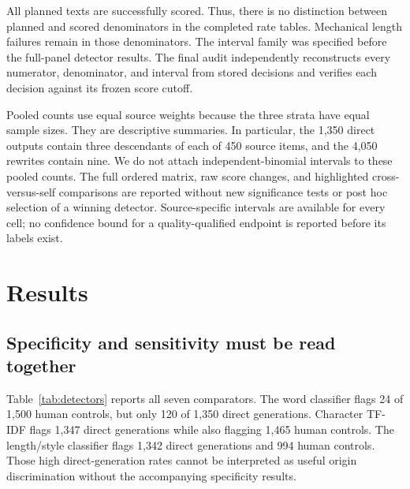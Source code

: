 All planned texts are successfully scored. Thus, there is no distinction between planned and scored denominators in the completed rate tables. Mechanical length failures remain in those denominators. The interval family was specified before the full-panel detector results. The final audit independently reconstructs every numerator, denominator, and interval from stored decisions and verifies each decision against its frozen score cutoff.

Pooled counts use equal source weights because the three strata have equal sample sizes. They are descriptive summaries. In particular, the 1,350 direct outputs contain three descendants of each of 450 source items, and the 4,050 rewrites contain nine. We do not attach independent-binomial intervals to these pooled counts. The full ordered matrix, raw score changes, and highlighted cross-versus-self comparisons are reported without new significance tests or post hoc selection of a winning detector. Source-specific intervals are available for every cell; no confidence bound for a quality-qualified endpoint is reported before its labels exist.

\section{Results}
\subsection{Specificity and sensitivity must be read together}
Table~\ref{tab:detectors} reports all seven comparators. The word classifier flags 24 of 1,500 human controls, but only 120 of 1,350 direct generations. Character TF-IDF flags 1,347 direct generations while also flagging 1,465 human controls. The length/style classifier flags 1,342 direct generations and 994 human controls. Those high direct-generation rates cannot be interpreted as useful origin discrimination without the accompanying specificity results.

